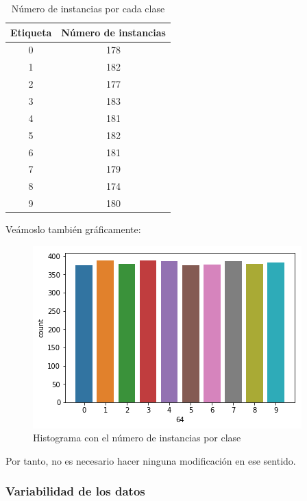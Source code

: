 \begin{table}[H]
	\centering
	\begin{tabular}{|c|c|}
		\hline
		Etiqueta & Número de instancias \\ \hline
		0        & 178                  \\ \hline
		1        & 182                  \\ \hline
		2        & 177                  \\ \hline
		3        & 183                  \\ \hline
		4        & 181                  \\ \hline
		5        & 182                  \\ \hline
		6        & 181                  \\ \hline
		7        & 179                  \\ \hline
		8        & 174                  \\ \hline
		9        & 180                  \\ \hline
	\end{tabular}
	\caption{Número de instancias por cada clase}
\end{table}

Veámoslo también gráficamente:

\begin{figure}[H] %
	\centering
	\includegraphics[scale=0.6]{count-clases.png}  %
	\caption{Histograma con el número de instancias por clase} 
	\label{fig:clases}
\end{figure}

Por tanto, no es necesario hacer ninguna modificación en ese sentido.

\subsubsection{Variabilidad de los datos}

